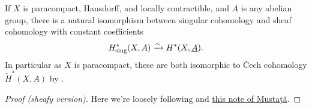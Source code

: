 \documentclass[11pt]{book}
\begin{document}
\begin{theorem}\label{thm:Cech-cohomology-and-singular-cohomology} 
If $X$ is paracompact, Hausdorff, and locally contractible, and $A$ is any abelian group, there is a natural isomorphism between singular cohomology and sheaf cohomology with constant coefficients
\begin{align*}
    H^\ast_\text{sing}(X,A) \xrightarrow{\sim} H^\ast(X,\underline{A}).
\end{align*}
In particular as $X$ is paracompact, these are both isomorphic to \v{C}ech cohomology $\check{H}^\ast(X,\underline{A})$ by .
\end{theorem}
\begin{proof}[Proof (sheafy version)] Here we're loosely following \cite[III.1]{Bredon-sheaf} and \href{https://public.websites.umich.edu/~mmustata/SingSheafcoho.pdf}{this note of Musta\c{t}\u{a}}.


\end{proof}
\end{document}
